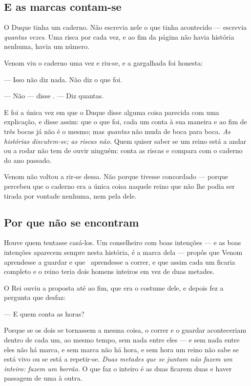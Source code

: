 \documentclass[livro.tex]{subfiles}
\begin{document}
\subsection*{E as marcas contam-se}

O Duque tinha um caderno. Não escrevia nele o que tinha acontecido --- escrevia \emph{quantas
vezes}. Uma risca por cada vez, e ao fim da página não havia história nenhuma, havia um número.

\medskip

Venom viu o caderno uma vez e riu-se, e a gargalhada foi honesta:

\medskip

--- Isso não diz nada. Não diz o que foi.

--- Não --- disse \Joa. --- Diz quantas.

\medskip

E foi a única vez em que o Duque disse alguma coisa parecida com uma explicação, e disse assim:
que o que foi, cada um conta à sua maneira e ao fim de três bocas já não é o mesmo; mas
\emph{quantas} não muda de boca para boca. \emph{As histórias discutem-se; as riscas não.} Quem
quiser saber se um reino está a andar ou a rodar não tem de ouvir ninguém: conta as riscas e
compara com o caderno do ano passado.

\medskip

Venom não voltou a rir-se dessa. Não porque tivesse concordado --- porque percebeu que o caderno
era a única coisa naquele reino que não lhe podia ser tirada por vontade nenhuma, nem pela dele.

\subsection*{Por que não se encontram}

Houve quem tentasse casá-los. Um conselheiro com boas intenções --- e as boas intenções aparecem
sempre nesta história, é a marca dela --- propôs que Venom aprendesse a guardar e que \Joa\
aprendesse a correr, e que assim cada um ficaria completo e o reino teria dois homens inteiros em
vez de duas metades.

\medskip

O Rei ouviu a proposta até ao fim, que era o costume dele, e depois fez a pergunta que desfaz:

\medskip

--- E quem conta as horas?

\medskip

Porque se os dois se tornassem a mesma coisa, o correr e o guardar aconteceriam dentro de cada um,
ao mesmo tempo, sem nada entre eles --- e sem nada entre eles não há marca, e sem marca não há
hora, e sem hora um reino não sabe se está vivo ou se está a repetir-se. \emph{Duas metades que se
juntam não fazem um inteiro: fazem um borrão.} O que faz o inteiro é as duas ficarem duas e
haver passagem de uma à outra.
\end{document}
